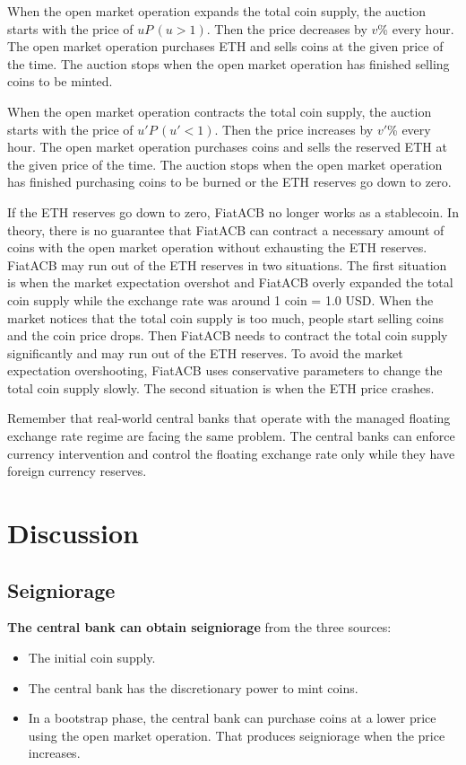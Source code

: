 \documentclass[dvipdfmx,a4paper]{article}
\begin{document}
When the open market operation expands the total coin supply, the auction starts with the price of $uP\,(u>1)$. Then the price decreases by $v$\% every hour. The open market operation purchases ETH and sells coins at the given price of the time. The auction stops when the open market operation has finished selling coins to be minted.

When the open market operation contracts the total coin supply, the auction starts with the price of $u'P\,(u'<1)$. Then the price increases by $v'$\% every hour. The open market operation purchases coins and sells the reserved ETH at the given price of the time. The auction stops when the open market operation has finished purchasing coins to be burned or the ETH reserves go down to zero.

If the ETH reserves go down to zero, FiatACB no longer works as a stablecoin. In theory, there is no guarantee that FiatACB can contract a necessary amount of coins with the open market operation without exhausting the ETH reserves. FiatACB may run out of the ETH reserves in two situations. The first situation is when the market expectation overshot and FiatACB overly expanded the total coin supply while the exchange rate was around 1 coin = 1.0 USD. When the market notices that the total coin supply is too much, people start selling coins and the coin price drops. Then FiatACB needs to contract the total coin supply significantly and may run out of the ETH reserves. To avoid the market expectation overshooting, FiatACB uses conservative parameters to change the total coin supply slowly. The second situation is when the ETH price crashes.

Remember that real-world central banks that operate with the managed floating exchange rate regime are facing the same problem. The central banks can enforce currency intervention and control the floating exchange rate only while they have foreign currency reserves.

\section{Discussion}

\subsection{Seigniorage}

\textbf{The central bank can obtain seigniorage} from the three sources:

\begin{itemize}
\item The initial coin supply.
\item The central bank has the discretionary power to mint coins.
\item In a bootstrap phase, the central bank can purchase coins at a lower price using the open market operation. That produces seigniorage when the price increases.
\end{itemize}
\end{document}
